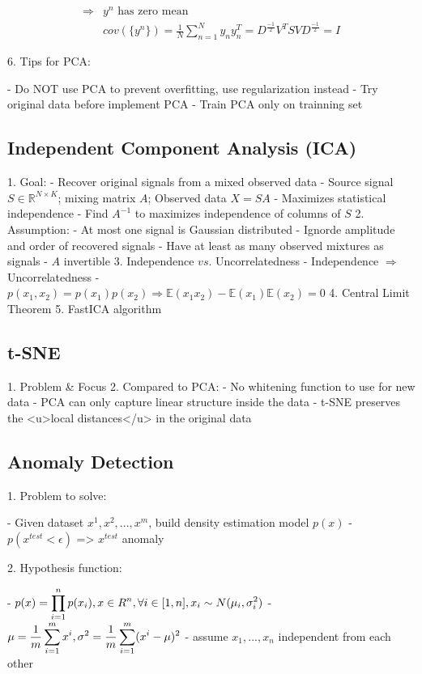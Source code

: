 \begin{align} \Rightarrow & \text{{$y^n$} has zero mean} \\ & \displaystyle cov(\{y^n\}) = \frac 1 N \sum_{n=1}^Ny_ny_n^T= D^{\frac {-1} 2}V^TSVD^{\frac{-1}2}=I \end{align}

6. Tips for PCA:

- Do NOT use PCA to prevent overfitting, use regularization instead
- Try original data before implement PCA
- Train PCA only on trainning set

\subsection{Independent Component Analysis (ICA)}

1. Goal:
- Recover original signals from a mixed observed data
- Source signal $S\in \mathbb R^{N\times K}$; mixing matrix $A$; Observed data $X=SA$
- Maximizes statistical independence
- Find $A^{-1}$ to maximizes independence of columns of $S$
2. Assumption: 
- At most one signal is Gaussian distributed
- Ignorde amplitude and order of recovered signals
- Have at least as many observed mixtures as signals
- $A$ invertible
3. Independence $vs.$ Uncorrelatedness
- Independence $\Rightarrow$ Uncorrelatedness
- $p(x_1,x_2)=p(x_1)p(x_2) \Rightarrow \mathbb E(x_1x_2)-\mathbb E(x_1)\mathbb E(x_2) = 0$ 
4. Central Limit Theorem
5. FastICA algorithm

\subsection{t-SNE}

1. Problem \& Focus
2. Compared to PCA:
- No whitening function to use for new data
- PCA can only capture linear structure inside the data
- t-SNE preserves the <u>local distances</u> in the original data

\subsection{Anomaly Detection}

1. Problem to solve:

- Given dataset {$x^1,x^2,...,x^m$}, build density estimation model $p(x)$
- $p(x^{test}<\epsilon)$ => $x^{test}$ anomaly 

2. Hypothesis function: 

- $\displaystyle p(x)=\prod^n_{i=1} p(x_i), \space x \in R^n,\forall i \in [1,n], \space x_i \sim N(\mu_i,\sigma_i^2)$ 
- $\displaystyle \mu=\frac1m \sum^m_{i=1}x^i,\space \sigma^2=\frac1m \sum^m_{i=1}(x^i-\mu)^2$ 
- assume $x_1,...,x_n$ independent from each other

